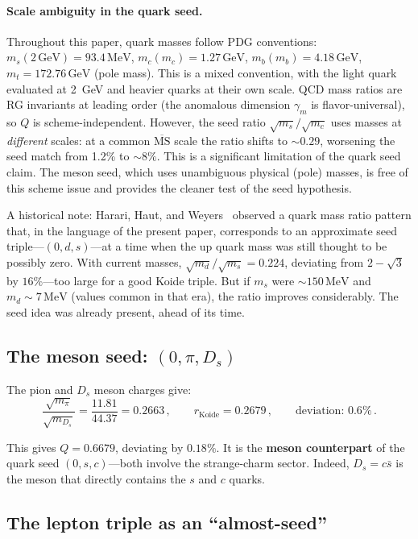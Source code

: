 \documentclass[12pt,a4paper]{article}
\newcommand{\MeV}{\,\text{MeV}}
\newcommand{\GeV}{\,\text{GeV}}
\begin{document}
\paragraph{Scale ambiguity in the quark seed.}
Throughout this paper, quark masses follow PDG conventions:
$m_s(2\GeV) = 93.4\MeV$, $m_c(m_c) = 1.27\GeV$,
$m_b(m_b) = 4.18\GeV$, $m_t = 172.76\GeV$ (pole mass). This is a
mixed convention, with the light quark evaluated at 2~GeV and heavier
quarks at their own scale. QCD mass ratios are RG invariants at
leading order (the anomalous dimension $\gamma_m$ is flavor-universal),
so $Q$ is scheme-independent. However, the seed ratio
$\sqrt{m_s}/\sqrt{m_c}$ uses masses at \emph{different} scales:
at a common $\overline{\text{MS}}$ scale the ratio shifts to
$\sim 0.29$, worsening the seed match from 1.2\% to $\sim 8\%$.
This is a significant limitation of the quark seed claim. The meson
seed, which uses unambiguous physical (pole) masses, is free of this
scheme issue and provides the cleaner test of the seed hypothesis.

A historical note: Harari, Haut, and Weyers~\cite{Harari} observed
a quark mass ratio pattern that, in the language of the present paper,
corresponds to an approximate seed triple---$(0, d, s)$---at a time
when the up quark mass was
still thought to be possibly zero. With current masses,
$\sqrt{m_d}/\sqrt{m_s} = 0.224$, deviating from $2 - \sqrt{3}$ by
$16\%$---too large for a good Koide triple. But if $m_s$ were
$\sim 150\MeV$ and $m_d \sim 7\MeV$ (values common in that era), the
ratio improves considerably. The seed idea was already present, ahead
of its time.

\subsection{The meson seed: $(0, \pi, D_s)$}

The pion and $D_s$ meson charges give:
\begin{equation}
\frac{\sqrt{m_\pi}}{\sqrt{m_{D_s}}} = \frac{11.81}{44.37} = 0.2663\,,
\qquad r_{\text{Koide}} = 0.2679\,, \qquad \text{deviation: } 0.6\%\,.
\end{equation}

This gives $Q = 0.6679$, deviating by $0.18\%$. It is the
\textbf{meson counterpart} of the quark seed $(0, s, c)$---both
involve the strange-charm sector. Indeed, $D_s = c\bar{s}$ is the
meson that directly contains the $s$ and $c$ quarks.

\subsection{The lepton triple as an ``almost-seed''}
\end{document}
